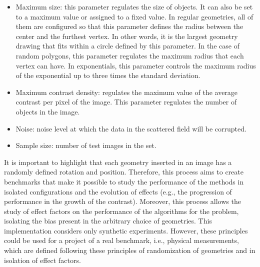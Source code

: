 \begin{itemize}
				\item Maximum size: this parameter regulates the size of objects. It can also be set to a maximum value or assigned to a fixed value. In regular geometries, all of them are configured so that this parameter defines the radius between the center and the furthest vertex. In other words, it is the largest geometry drawing that fits within a circle defined by this parameter. In the case of random polygons, this parameter regulates the maximum radius that each vertex can have. In exponentials, this parameter controls the maximum radius of the exponential up to three times the standard deviation. %
				\item Maximum contrast density: regulates the maximum value of the average contrast per pixel of the image. This parameter regulates the number of objects in the image.
				\item Noise: noise level at which the data in the scattered field will be corrupted.
				\item Sample size: number of test images in the set.
			\end{itemize}
			It is important to highlight that each geometry inserted in an image has a randomly defined rotation and position. Therefore, this process aims to create benchmarks that make it possible to study the performance of the methods in isolated configurations and the evolution of effects (e.g., the progression of performance in the growth of the contrast). Moreover, this process allows the study of effect factors on the performance of the algorithms for the problem, isolating the bias present in the arbitrary choice of geometries. This implementation considers only synthetic experiments. However, these principles could be used for a project of a real benchmark, i.e., physical measurements, which are defined following these principles of randomization of geometries and in isolation of effect factors.
		
